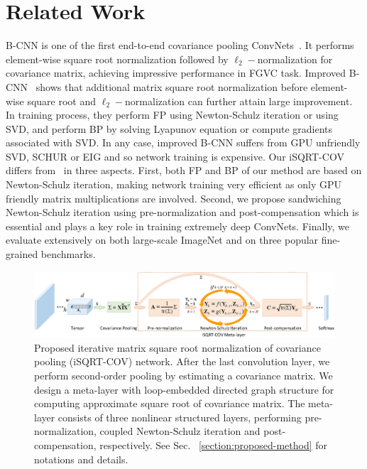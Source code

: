 \documentclass[10pt,twocolumn,letterpaper]{article}
\begin{document}
\section{Related Work}\label{section:related-work}

B-CNN is one of the first end-to-end covariance  pooling ConvNets~\cite{lin2015bilinear,Ionescu_2015_ICCV}. It performs element-wise  square root normalization followed by $\ell_{2}-$normalization for covariance matrix, achieving impressive performance in FGVC task. Improved B-CNN~\cite{lin2017improved} shows that additional matrix square root normalization before element-wise square root and $\ell_{2}-$normalization  can further attain  large  improvement. In training process, they perform FP using Newton-Schulz iteration  or using SVD, and perform BP by solving Lyapunov equation or compute gradients associated with SVD. In any  case, improved B-CNN suffers from GPU unfriendly  SVD, SCHUR or EIG and so network training is expensive. Our iSQRT-COV differs from~\cite{lin2017improved} in three aspects. First, both FP and BP of our method are based on Newton-Schulz iteration, making network training very efficient as only GPU friendly matrix multiplications are involved. Second, we propose sandwiching    Newton-Schulz iteration using  pre-normalization  and post-compensation which is essential and plays a key role in training extremely  deep ConvNets. Finally, we evaluate extensively on both large-scale ImageNet and  on three popular fine-grained benchmarks. 

\begin{figure}[t]
\begin{center}
   \includegraphics[width=1.0\linewidth]{overview.eps}
\end{center}
\caption{Proposed iterative matrix square root normalization of covariance pooling  (iSQRT-COV) network. After the last convolution layer, we perform second-order pooling by estimating a covariance matrix. We design a meta-layer with loop-embedded directed graph structure for computing approximate square root of covariance matrix. The meta-layer  consists of  three  nonlinear structured layers, performing pre-normalization, coupled  Newton-Schulz iteration and post-compensation, respectively.  See Sec. ~\ref{section:proposed-method} for  notations and  details.}
\label{fig:overview}
\end{figure}
\end{document}
